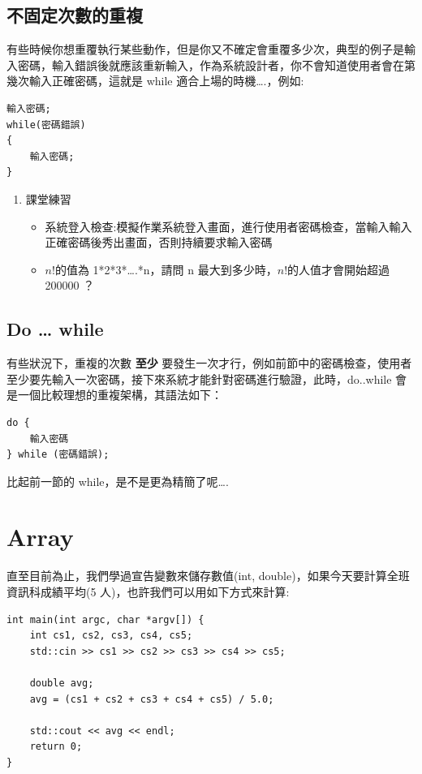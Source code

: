 \documentclass[a4paper,12pt]{article}
\begin{document}
\subsection{不固定次數的重複}
\label{sec:orgc9b354d}
有些時候你想重覆執行某些動作，但是你又不確定會重覆多少次，典型的例子是輸入密碼，輸入錯誤後就應該重新輸入，作為系統設計者，你不會知道使用者會在第幾次輸入正確密碼，這就是 while 適合上場的時機\ldots{}.，例如:\\
\lstset{breaklines=true,language=cpp,label= ,caption= ,captionpos=b,firstnumber=1,numbers=left}
\begin{lstlisting}
輸入密碼;
while(密碼錯誤)
{
    輸入密碼;
}
\end{lstlisting}

\begin{enumerate}
\item 課堂練習
\label{sec:org859c12a}
\begin{itemize}
\item 系統登入檢查:模擬作業系統登入畫面，進行使用者密碼檢查，當輸入輸入正確密碼後秀出畫面，否則持續要求輸入密碼\\
\item \(n!\)的值為 1*2*3*\ldots{}.*n，請問 n 最大到多少時，\(n!\)的人值才會開始超過 200000 ？\\
\end{itemize}
\end{enumerate}

\subsection{Do \ldots{} while}
\label{sec:orgc3604d9}
有些狀況下，重複的次數 \textbf{至少} 要發生一次才行，例如前節中的密碼檢查，使用者至少要先輸入一次密碼，接下來系統才能針對密碼進行驗證，此時，do..while 會是一個比較理想的重複架構，其語法如下：\\
\lstset{breaklines=true,language=cpp,label= ,caption= ,captionpos=b,firstnumber=1,numbers=left}
\begin{lstlisting}
do {
    輸入密碼
} while (密碼錯誤);
\end{lstlisting}

比起前一節的 while，是不是更為精簡了呢\ldots{}.\\

\section{Array}
\label{cpp_arrays}
直至目前為止，我們學過宣告變數來儲存數值(int, double)，如果今天要計算全班資訊科成績平均(5 人)，也許我們可以用如下方式來計算:\\
\lstset{breaklines=true,language=cpp,label= ,caption= ,captionpos=b,firstnumber=1,numbers=left}
\begin{lstlisting}
int main(int argc, char *argv[]) {
    int cs1, cs2, cs3, cs4, cs5;
    std::cin >> cs1 >> cs2 >> cs3 >> cs4 >> cs5;

    double avg;
    avg = (cs1 + cs2 + cs3 + cs4 + cs5) / 5.0;

    std::cout << avg << endl;
    return 0;
}
\end{lstlisting}
\end{document}
